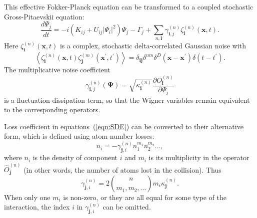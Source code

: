 \documentclass[aps,prl,twocolumn,showpacs,amsmath,amssymb,superscriptaddress]{revtex4-1}
\newcommand{\xvec}{\boldsymbol{x}}
\newcommand{\ivec}{\boldsymbol{i}}
\newcommand{\jvec}{\boldsymbol{j}}
\newcommand{\Psivec}{\boldsymbol{\Psi}}
\begin{document}
This effective Fokker-Planck equation can be transformed
to a coupled stochastic Gross-Pitaevskii equation:
\begin{equation}
\label{eqn:SDE}
	\frac{d\Psi_{j}}{dt} = -i \left( K_{ij} + U_{ij} \lvert \Psi_{i} \rvert ^{2} \right) \Psi_{j} -
	\Gamma_{j} + \sum_{n,\ivec} \gamma_{\ivec,j}^{(n)} \zeta_{\ivec}^{(n)} (\xvec,t).
\end{equation}
Here $\zeta_{\ivec}^{(n)}(\xvec, t)$ is a complex,
stochastic delta-correlated Gaussian noise with
\begin{equation}
	\left\langle
		\zeta_{\ivec}^{(n)} (\xvec,t) \zeta_{\jvec}^{(m)}(\xvec^\prime, t^\prime)
	\right\rangle =
	\delta_{\ivec \jvec} \delta^{nm} \delta^{D} \left(
		\xvec - \xvec^\prime
	\right)
	\delta \left( t - t^\prime \right).
\end{equation}
The multiplicative noise coefficient
\begin{equation}
	\gamma_{\ivec,j}^{(n)} \left( \Psivec \right) =
	\sqrt{\kappa_{\ivec}^{(n)}}
	\frac{\partial O_{\ivec}^{(n)}}{\partial\Psi_{j}}
\end{equation}
is a fluctuation-dissipation term,
so that the Wigner variables remain equivalent to the corresponding operators.

Loss coefficient in equations~(\ref{eqn:SDE}) can be converted to their alternative form,
which is defined using atom number losses:
\begin{equation}
	\dot{n_i} = - \gamma^{(n)}_{\jvec,i} n^{m_1}_1 n^{m_2}_2 \ldots ,
\end{equation}
where $n_i$ is the density of component $i$ and $m_i$
is its multiplicity in the operator $\hat{O}^{(n)}_{\jvec}$
(in other words, the number of atoms lost in the collision).
Thus
\begin{equation}
	\gamma^{(n)}_{\jvec,i} = 2 {n \choose m_1, m_2, \ldots} m_i \kappa^{(n)}_{\jvec}.
\end{equation}
When only one $m_i$ is non-zero, or they are all equal for some type of the interaction,
the index $i$ in $\gamma^{(n)}_{\jvec,i}$ can be omitted.
\end{document}
